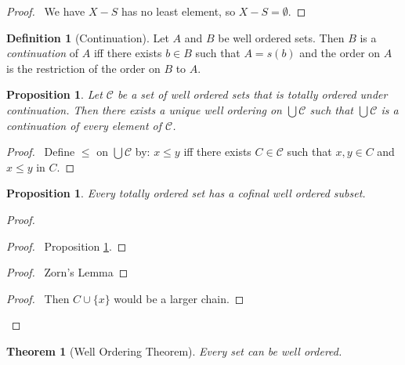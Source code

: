 \documentclass{report}
\let\qed\relax
\newtheorem{prop}[ax]{Proposition}
\newtheorem{thm}[ax]{Theorem}
\theoremstyle{definition}
\newtheorem{df}[ax]{Definition}
\begin{document}
\begin{proof}
\pf\ We have $X - S$ has no least element, so $X - S = \emptyset$. \qed
\end{proof}

\begin{df}[Continuation]
Let $A$ and $B$ be well ordered sets. Then $B$ is a \emph{continuation} of $A$ iff there exists $b \in B$ such that $A = s(b)$ and the order on $A$ is the restriction of the order on $B$ to $A$.
\end{df}

\begin{prop}
\label{prop:union_under_continuation}
Let $\mathcal{C}$ be a set of well ordered sets that is totally ordered under continuation. Then there exists a unique well ordering on $\bigcup \mathcal{C}$ such that $\bigcup \mathcal{C}$ is a continuation of every element of $\mathcal{C}$.
\end{prop}

\begin{proof}
\pf\ Define $\leq$ on $\bigcup \mathcal{C}$ by: $x \leq y$ iff there exists $C \in \mathcal{C}$ such that $x, y \in C$ and $x \leq y$ in $C$. \qed
\end{proof}

\begin{prop}
Every totally ordered set has a cofinal well ordered subset.
\end{prop}

\begin{proof}
\pf
{}
\begin{proof}
	\pf\ Proposition \ref{prop:union_under_continuation}.
\end{proof}
\begin{proof}
	\pf\ Zorn's Lemma
\end{proof}
\begin{proof}
	\pf\ Then $C \cup \{x\}$ would be a larger chain.
\end{proof}
\qed
\end{proof}

\begin{thm}[Well Ordering Theorem]
Every set can be well ordered.
\end{thm}
\end{document}

